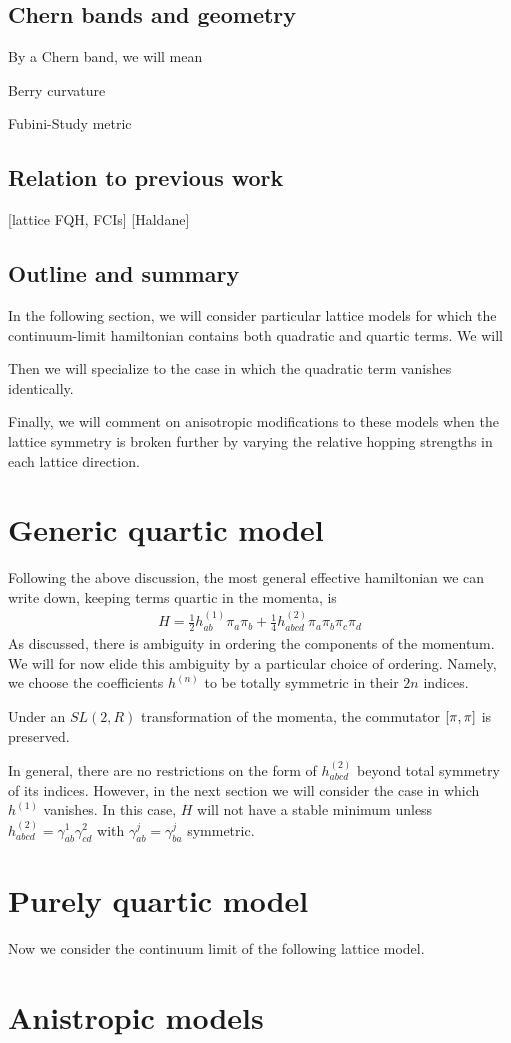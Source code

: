 \documentclass[aps,prb,twocolumn,letterpaper,twoside,nobalancelastpage,groupedaddress,amsmath,amssymb,floatfix,citeautoscript]{revtex4-1}
\begin{document}
\subsection{Chern bands and geometry}
By a Chern band, we will mean

Berry curvature

Fubini-Study metric


\subsection{Relation to previous work}
[lattice FQH, FCIs]
[Haldane]

\subsection{Outline and summary}
In the following section, we will consider particular lattice models for which the continuum-limit hamiltonian contains both quadratic and quartic terms. We will 

Then we will specialize to the case in which the quadratic term vanishes identically. 

Finally, we will comment on anisotropic modifications to these models when the lattice symmetry is broken further by varying the relative hopping strengths in each lattice direction.

\section{Generic quartic model}
Following the above discussion, the most general effective hamiltonian we can write down, keeping terms quartic in the momenta, is 
\begin{align*}
H = \frac{1}{2}h^{(1)}_{ab} \pi_a \pi_b + \frac{1}{4}h^{(2)}_{abcd} \pi_a \pi_b \pi_c \pi_d
\end{align*}
As discussed, there is ambiguity in ordering the components of the momentum. We will for now elide this ambiguity by a particular choice of ordering. Namely, we choose the coefficients $h^{(n)}$ to be totally symmetric in their $2n$ indices.

Under an $SL(2,R)$ transformation of the momenta, the commutator $\comm{\pi}{\pi}$ is preserved.

In general, there are no restrictions on the form of $h^{(2)}_{abcd}$ beyond total symmetry of its indices. However, in the next section we will consider the case in which $h^{(1)}$ vanishes. In this case, $H$ will not have a stable minimum unless $h^{(2)}_{abcd} = \gamma^1_{ab}\gamma^2_{cd}$ with $\gamma^j_{ab} = \gamma^{j}_{ba}$ symmetric.


\section{Purely quartic model}
Now we consider the continuum limit of the following lattice model.




\section{Anistropic models}

\begin{acknowledgments}

\end{acknowledgments}


% 
\end{document}
